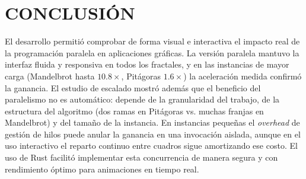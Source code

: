 \section*{CONCLUSIÓN}
El desarrollo permitió comprobar de forma visual e interactiva el impacto real de la programación paralela en aplicaciones gráficas. La versión paralela mantuvo la interfaz fluida y responsiva en todos los fractales, y en las instancias de mayor carga
(Mandelbrot hasta $10.8\times$, Pitágoras $1.6\times$) la aceleración medida confirmó la ganancia. El estudio de escalado mostró además que el beneficio del paralelismo no es automático: depende de la granularidad del trabajo, de la estructura del algoritmo (dos ramas en Pitágoras vs. muchas franjas en Mandelbrot) y del tamaño de la instancia. En instancias pequeñas el \textit{overhead} de gestión de hilos puede anular la ganancia en una invocación aislada, aunque en el uso interactivo el reparto continuo entre cuadros sigue amortizando ese costo. El uso de Rust facilitó implementar esta concurrencia de manera segura y con rendimiento óptimo para animaciones en tiempo real.


